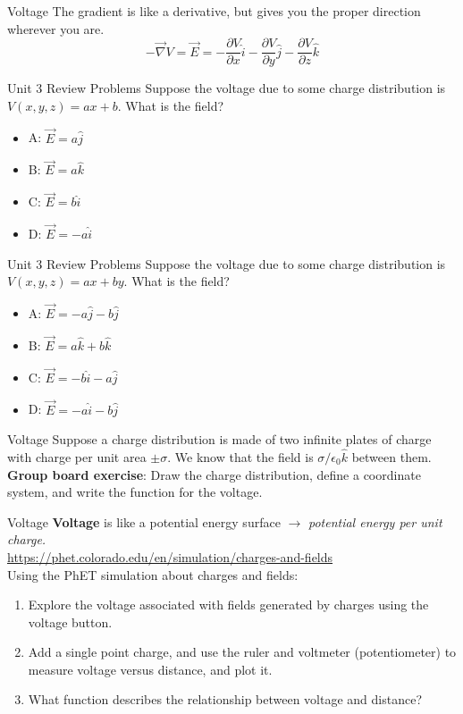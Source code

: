 \documentclass{beamer}
\begin{document}
\begin{frame}{Voltage}
The gradient is like a derivative, but gives you the proper direction wherever you are.
\begin{equation}
\boxed{
-\vec{\nabla} V = \vec{E} = -\frac{\partial V}{\partial x}\hat{i}-\frac{\partial V}{\partial y}\hat{j}-\frac{\partial V}{\partial z}\hat{k}}
\end{equation}
\end{frame}

\begin{frame}{Unit 3 Review Problems}
Suppose the voltage due to some charge distribution is $V(x,y,z) = ax+b$.  What is the field?
\begin{itemize}
\item A: $\vec{E} = a\hat{j}$
\item B: $\vec{E} = a\hat{k}$
\item C: $\vec{E} = b\hat{i}$
\item D: $\vec{E} = -a\hat{i}$
\end{itemize}
\end{frame}

\begin{frame}{Unit 3 Review Problems}
Suppose the voltage due to some charge distribution is $V(x,y,z) = ax+by$.  What is the field?
\begin{itemize}
\item A: $\vec{E} = -a\hat{j}-b\hat{j}$
\item B: $\vec{E} = a\hat{k}+b\hat{k}$
\item C: $\vec{E} = -b\hat{i}-a\hat{j}$
\item D: $\vec{E} = -a\hat{i}-b\hat{j}$
\end{itemize}
\end{frame}

\begin{frame}{Voltage}
Suppose a charge distribution is made of two infinite plates of charge with charge per unit area $\pm\sigma$.  We know that the field is $\sigma/\epsilon_0 \hat{k}$ between them.  \textbf{Group board exercise}: Draw the charge distribution, define a coordinate system, and write the function for the voltage.
\end{frame}

\begin{frame}{Voltage}
\textbf{Voltage} is like a potential energy surface $\rightarrow$ \textit{potential energy per unit charge.} \\ \vspace{0.5cm}
\url{https://phet.colorado.edu/en/simulation/charges-and-fields} \\
\alert{Using the PhET simulation about charges and fields}:
\begin{enumerate}
\item Explore the voltage associated with fields generated by charges using the voltage button.
\item Add a single point charge, and use the ruler and voltmeter (potentiometer) to measure voltage versus distance, and plot it.
\item What function describes the relationship between voltage and distance?
\end{enumerate}
\end{frame}
\end{document}
